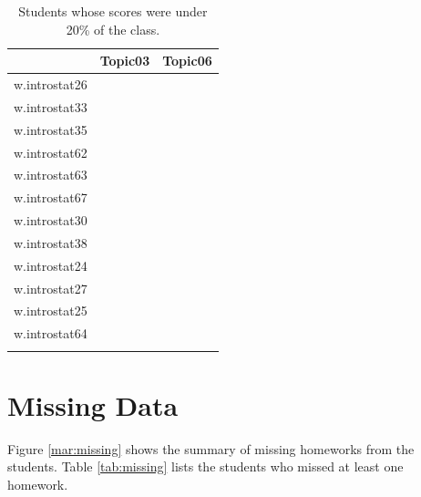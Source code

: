 \documentclass[12pt,nohyper]{tufte-handout}\usepackage[]{graphicx}\usepackage[]{color}
\begin{document}
\begin{longtable}{rll}
  \hline
 & Topic03 & Topic06 \\ 
  \hline
w.introstat26 & \color{red}{X} &  \\ 
  w.introstat33 & \color{red}{X} &  \\ 
  w.introstat35 & \color{red}{X} &  \\ 
  w.introstat62 & \color{red}{X} &  \\ 
  w.introstat63 & \color{red}{X} &  \\ 
  w.introstat67 & \color{red}{X} &  \\ 
  w.introstat30 &  & \color{red}{X} \\ 
  w.introstat38 & \color{red}{X} &  \\ 
  w.introstat24 & \color{red}{X} & \color{red}{X} \\ 
  w.introstat27 & \color{red}{X} & \color{red}{X} \\ 
  w.introstat25 &  & \color{red}{X} \\ 
  w.introstat64 & \color{red}{X} & \color{red}{X} \\ 
   \hline
\hline
\caption{Students whose scores were under 20\% of the class.} 
\label{tab:lag}
\end{longtable}


\clearpage
\newpage{}
\section{Missing Data}
Figure \ref{mar:missing} shows the summary of missing homeworks from the students. 
Table \ref{tab:missing} lists the students who missed at least one homework. 
\end{document}
